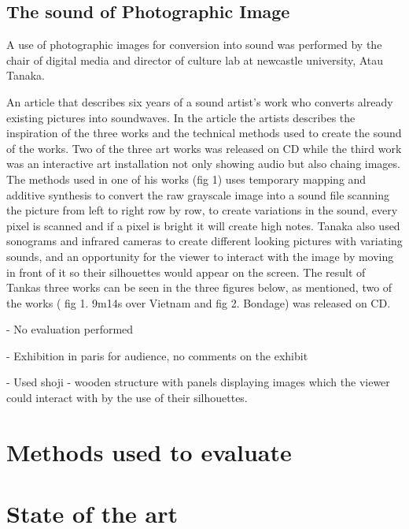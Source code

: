 \subsection{The sound of Photographic Image}\label{sec:soundarticle}

A use of photographic images for conversion into sound was performed by the chair of digital media and director of culture lab at newcastle university, Atau Tanaka. 


An article that describes six years of a sound artist's work  who converts already existing pictures into soundwaves. In the article the artists describes the inspiration of the three works and the technical methods used to create the sound of the works. Two of the three art works was released on CD while the third work was an interactive art installation not only showing audio but also chaing images. The methods used in one of his works (fig 1) uses temporary mapping and additive synthesis to convert the raw grayscale image into a sound file scanning the picture from left to right row by row, to create variations in the sound, every pixel is scanned and if a pixel is bright it will create high notes.  Tanaka also used sonograms and infrared cameras to create different looking pictures with variating sounds, and an opportunity for the viewer to interact with the image by moving in front of it so their silhouettes would appear on the screen. The result of Tankas three works can be seen in the three figures below, as mentioned, two of the works ( fig 1. 9m14s over Vietnam and fig 2. Bondage) was released on CD.


- No evaluation performed

- Exhibition in paris for audience, no comments on the exhibit

- Used shoji - wooden structure with panels displaying images which the viewer could interact with by the use of their silhouettes. 
 

\section{Methods used to evaluate}\label{sub:methodsusedtoevaluate}






\section{State of the art}\label{sec:stateart}

